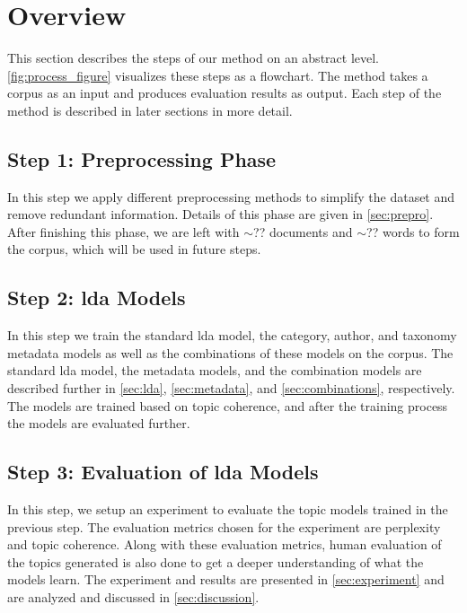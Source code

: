 \section{Overview}\label{sec:overview}
This section describes the steps of our method on an abstract level.
\autoref{fig:process_figure} visualizes these steps as a flowchart.
The method takes a corpus as an input and produces evaluation results as output.
Each step of the method is described in later sections in more detail.

\subsection*{Step 1: Preprocessing Phase}
In this step we apply different preprocessing methods to simplify the dataset and remove redundant information.
Details of this phase are given in \autoref{sec:prepro}.
After finishing this phase, we are left with $\sim$?? documents and $\sim$?? words to form the corpus, which will be used in future steps.

\subsection*{Step 2: \Gls{lda} Models}
In this step we train the standard \gls{lda} model, the category, author, and taxonomy metadata models as well as the combinations of these models on the corpus.
The standard \gls{lda} model, the metadata models, and the combination models are described further in \autoref{sec:lda}, \autoref{sec:metadata}, and \autoref{sec:combinations}, respectively.
The models are trained based on topic coherence, and after the training process the models are evaluated further.

\subsection*{Step 3: Evaluation of \gls{lda} Models}
In this step, we setup an experiment to evaluate the topic models trained in the previous step.
The evaluation metrics chosen for the experiment are perplexity and topic coherence.
Along with these evaluation metrics, human evaluation of the topics generated is also done to get a deeper understanding of what the models learn.
The experiment and results are presented in \autoref{sec:experiment} and are analyzed and discussed in \autoref{sec:discussion}.


